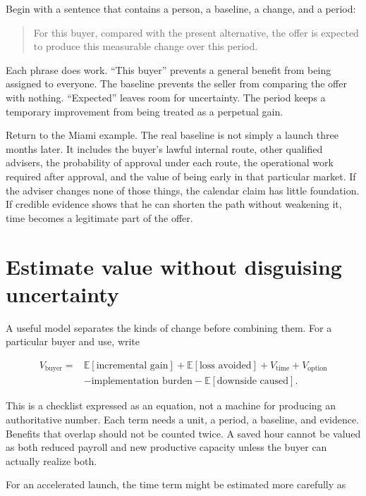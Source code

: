 Begin with a sentence that contains a person, a baseline, a change, and a
period:

\begin{quote}
For this buyer, compared with the present alternative, the offer is expected
to produce this measurable change over this period.
\end{quote}

Each phrase does work. ``This buyer'' prevents a general benefit from being
assigned to everyone. The baseline prevents the seller from comparing the
offer with nothing. ``Expected'' leaves room for uncertainty. The period keeps
a temporary improvement from being treated as a perpetual gain.

Return to the Miami example. The real baseline is not simply a launch three
months later. It includes the buyer's lawful internal route, other qualified
advisers, the probability of approval under each route, the operational work
required after approval, and the value of being early in that particular
market. If the adviser changes none of those things, the calendar claim has
little foundation. If credible evidence shows that he can shorten the path
without weakening it, time becomes a legitimate part of the offer.

\section{Estimate value without disguising uncertainty}

A useful model separates the kinds of change before combining them. For a
particular buyer and use, write

\begin{equation}
\begin{aligned}
V_{\mathrm{buyer}}={}&
  \mathbb{E}[\text{incremental gain}]
  + \mathbb{E}[\text{loss avoided}]
  + V_{\mathrm{time}} + V_{\mathrm{option}} \\
 &- \text{implementation burden}
  - \mathbb{E}[\text{downside caused}].
\end{aligned}
\end{equation}

This is a checklist expressed as an equation, not a machine for producing an
authoritative number. Each term needs a unit, a period, a baseline, and
evidence. Benefits that overlap should not be counted twice. A saved hour
cannot be valued as both reduced payroll and new productive capacity unless
the buyer can actually realize both.

For an accelerated launch, the time term might be estimated more carefully as

